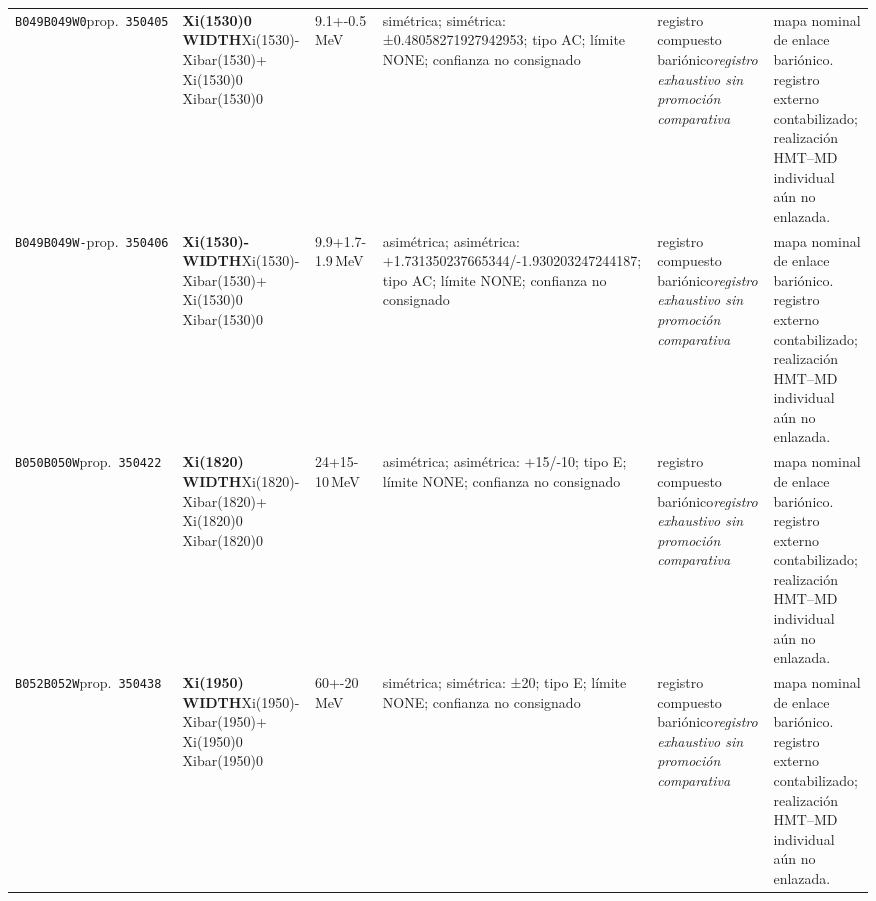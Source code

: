 \begin{landscape}
\begin{longtable}{L{1.85cm}L{4.45cm}L{2.35cm}L{4.05cm}L{3.35cm}L{7.15cm}}
\texttt{B049}\newline \texttt{B049W0}\newline prop.\ \texttt{350405} & \textbf{Xi(1530)0 WIDTH}\newline Xi(1530)- \textbar{}\allowbreak{} Xibar(1530)+ \textbar{}\allowbreak{} Xi(1530)0 \textbar{}\allowbreak{} Xibar(1530)0 & 9.1+-0.5\,MeV & simétrica; simétrica: ±0.48058271927942953; tipo AC; límite NONE; confianza no consignado & registro compuesto bariónico\newline \emph{registro exhaustivo sin promoción comparativa} & mapa nominal de enlace bariónico. registro externo contabilizado; realización HMT--MD individual aún no enlazada. \\
\texttt{B049}\newline \texttt{B049W-}\newline prop.\ \texttt{350406} & \textbf{Xi(1530)- WIDTH}\newline Xi(1530)- \textbar{}\allowbreak{} Xibar(1530)+ \textbar{}\allowbreak{} Xi(1530)0 \textbar{}\allowbreak{} Xibar(1530)0 & 9.9+1.7-1.9\,MeV & asimétrica; asimétrica: +1.731350237665344/-1.930203247244187; tipo AC; límite NONE; confianza no consignado & registro compuesto bariónico\newline \emph{registro exhaustivo sin promoción comparativa} & mapa nominal de enlace bariónico. registro externo contabilizado; realización HMT--MD individual aún no enlazada. \\
\texttt{B050}\newline \texttt{B050W}\newline prop.\ \texttt{350422} & \textbf{Xi(1820) WIDTH}\newline Xi(1820)- \textbar{}\allowbreak{} Xibar(1820)+ \textbar{}\allowbreak{} Xi(1820)0 \textbar{}\allowbreak{} Xibar(1820)0 & 24+15-10\,MeV & asimétrica; asimétrica: +15/-10; tipo E; límite NONE; confianza no consignado & registro compuesto bariónico\newline \emph{registro exhaustivo sin promoción comparativa} & mapa nominal de enlace bariónico. registro externo contabilizado; realización HMT--MD individual aún no enlazada. \\
\texttt{B052}\newline \texttt{B052W}\newline prop.\ \texttt{350438} & \textbf{Xi(1950) WIDTH}\newline Xi(1950)- \textbar{}\allowbreak{} Xibar(1950)+ \textbar{}\allowbreak{} Xi(1950)0 \textbar{}\allowbreak{} Xibar(1950)0 & 60+-20\,MeV & simétrica; simétrica: ±20; tipo E; límite NONE; confianza no consignado & registro compuesto bariónico\newline \emph{registro exhaustivo sin promoción comparativa} & mapa nominal de enlace bariónico. registro externo contabilizado; realización HMT--MD individual aún no enlazada. \\

\end{longtable}
\end{landscape}
